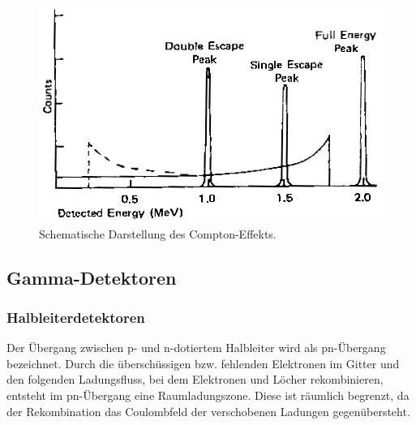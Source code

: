 \documentclass[
	a4paper,
	12pt,
	pagesize,
	ngerman
]{scrartcl}
\begin{document}
		\begin{figure}[H]
				\includegraphics[width= 0.75 \linewidth]{charts/Spektrumschema}
				\caption{
					Schematische Darstellung des Compton-Effekts.
					\cite{Anleitung}
				}
				\label{fig_Gammaspektrum}
		\end{figure}

	\subsection{Gamma-Detektoren}

	\subsubsection{Halbleiterdetektoren}

	Der Übergang zwischen p- und n-dotiertem Halbleiter wird als pn-Übergang bezeichnet.
	Durch die überschüssigen bzw. fehlenden Elektronen im Gitter und den folgenden Ladungsfluss, bei dem Elektronen und Löcher rekombinieren, entsteht im pn-Übergang eine Raumladungszone.
	Diese ist räumlich begrenzt, da der Rekombination das Coulombfeld der verschobenen Ladungen gegenübersteht.
\end{document}
